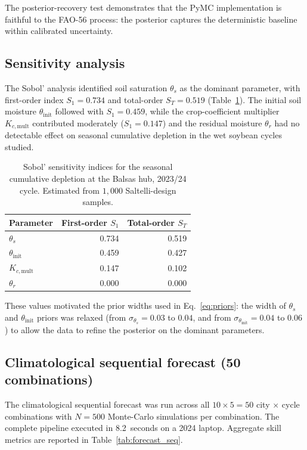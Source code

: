 \documentclass[review,5p,times]{elsarticle}
\begin{document}
The posterior-recovery test demonstrates that the PyMC implementation
is faithful to the FAO-56 process: the posterior captures the
deterministic baseline within calibrated uncertainty.

\subsection{Sensitivity analysis}\label{sec:results_sensitivity}

The Sobol' analysis identified soil saturation $\theta_s$ as the
dominant parameter, with first-order index $S_1 = 0.734$ and
total-order $S_T = 0.519$ (Table~\ref{tab:sobol}). The initial soil
moisture $\theta_{\mathrm{init}}$ followed with $S_1 = 0.459$, while
the crop-coefficient multiplier $K_{c,\mathrm{mult}}$ contributed
moderately ($S_1 = 0.147$) and the residual moisture $\theta_r$ had
no detectable effect on seasonal cumulative depletion in the wet
soybean cycles studied.

\begin{table}[!t]
\centering
\caption{Sobol' sensitivity indices for the seasonal cumulative
depletion at the Balsas hub, 2023/24 cycle. Estimated from $1{,}000$
Saltelli-design samples.}
\label{tab:sobol}
\begin{tabular}{lrr}
\toprule
Parameter & First-order $S_1$ & Total-order $S_T$ \\
\midrule
$\theta_s$              & 0.734 & 0.519 \\
$\theta_{\mathrm{init}}$ & 0.459 & 0.427 \\
$K_{c,\mathrm{mult}}$   & 0.147 & 0.102 \\
$\theta_r$              & 0.000 & 0.000 \\
\bottomrule
\end{tabular}
\end{table}

These values motivated the prior widths used in
Eq.~\ref{eq:priors}: the width of $\theta_s$ and
$\theta_{\mathrm{init}}$ priors was relaxed (from
$\sigma_{\theta_s} = 0.03$ to $0.04$, and from
$\sigma_{\theta_{\mathrm{init}}} = 0.04$ to $0.06$) to allow the data
to refine the posterior on the dominant parameters.

\subsection{Climatological sequential forecast (50 combinations)}
\label{sec:results_forecast}

The climatological sequential forecast was run across all
$10 \times 5 = 50$ city $\times$ cycle combinations with $N = 500$
Monte-Carlo simulations per combination. The complete pipeline
executed in 8.2~seconds on a 2024 laptop. Aggregate skill metrics
are reported in Table~\ref{tab:forecast_seq}.
\end{document}
